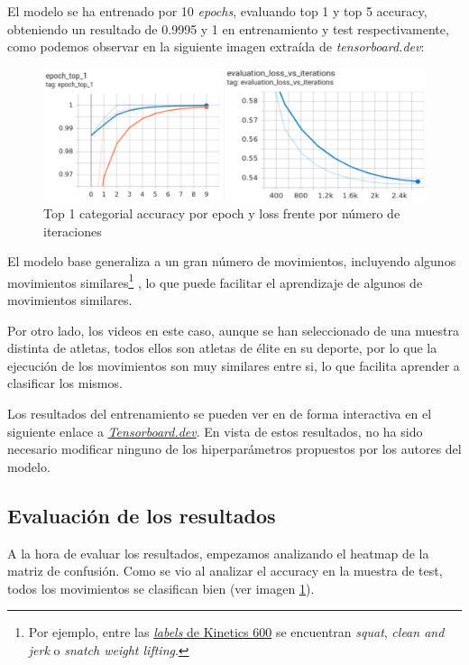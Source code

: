 El modelo se ha entrenado por 10 \textit{epochs}, evaluando top 1 y top 5 accuracy, obteniendo un resultado de 0.9995 y 1 en entrenamiento y test respectivamente, como podemos observar en la siguiente imagen extraída de \textit{tensorboard.dev}:

\begin{figure}[H]
    \centering
		\includegraphics[width=\textwidth]{figs/tensorboard_training.png}
\caption{Top 1 categorial accuracy por epoch y loss frente por número de iteraciones}\label{training}
\end{figure}

El modelo base generaliza a un gran número de movimientos, incluyendo algunos movimientos similares\footnote{Por ejemplo, entre las  \href{https://raw.githubusercontent.com/tensorflow/models/f8af2291cced43fc9f1d9b41ddbf772ae7b0d7d2/official/projects/movinet/files/kinetics_600_labels.txt}{\textit{labels} de Kinetics 600} se encuentran \textit{squat}, \textit{clean and jerk} o \textit{snatch weight lifting}.} , lo que puede facilitar el aprendizaje de algunos de movimientos similares.

Por otro lado, los videos en este caso, aunque se han seleccionado de una muestra distinta de atletas, todos ellos son atletas de élite en su deporte, por lo que la ejecución de los movimientos son muy similares entre si, lo que facilita aprender a clasificar los mismos.

Los resultados del entrenamiento se pueden ver en de forma interactiva en el siguiente enlace a \href{https://tensorboard.dev/experiment/UXyupsnMQ2S74vdul3vdbw/#scalars}{\textit{Tensorboard.dev}}. En vista de estos resultados, no ha sido necesario modificar ninguno de los hiperparámetros propuestos por los autores del modelo.


\subsection{Evaluación de los resultados}

A la hora de evaluar los resultados, empezamos analizando el heatmap de la matriz de confusión. Como se vio al analizar el accuracy en la muestra de test, todos los movimientos se clasifican bien (ver imagen \ref{training}).

